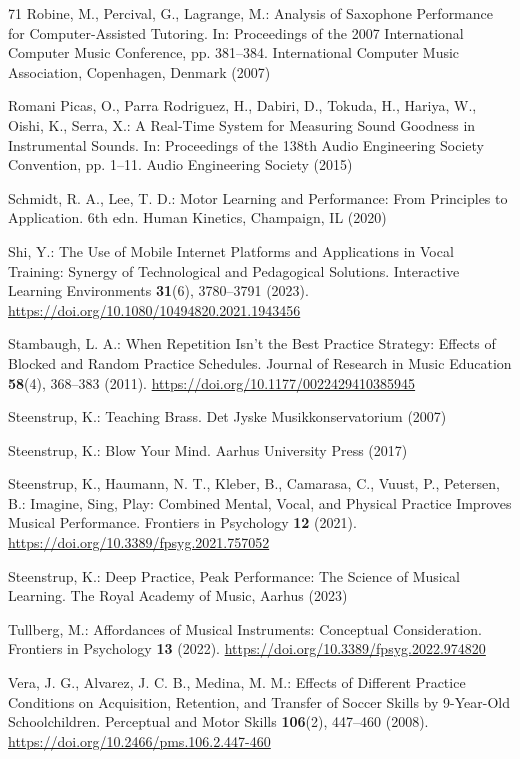 \documentclass[runningheads]{llncs}
\begin{document}
\begin{thebibliography}{71}
Robine, M., Percival, G., Lagrange, M.: Analysis of Saxophone Performance for Computer-Assisted Tutoring. In: Proceedings of the 2007 International Computer Music Conference, pp. 381--384. International Computer Music Association, Copenhagen, Denmark (2007)

Romani Picas, O., Parra Rodriguez, H., Dabiri, D., Tokuda, H., Hariya, W., Oishi, K., Serra, X.: A Real-Time System for Measuring Sound Goodness in Instrumental Sounds. In: Proceedings of the 138th Audio Engineering Society Convention, pp. 1--11. Audio Engineering Society (2015)

Schmidt, R. A., Lee, T. D.: Motor Learning and Performance: From Principles to Application. 6th edn. Human Kinetics, Champaign, IL (2020)

Shi, Y.: The Use of Mobile Internet Platforms and Applications in Vocal Training: Synergy of Technological and Pedagogical Solutions. Interactive Learning Environments \textbf{31}(6), 3780--3791 (2023). \url{https://doi.org/10.1080/10494820.2021.1943456}

Stambaugh, L. A.: When Repetition Isn’t the Best Practice Strategy: Effects of Blocked and Random Practice Schedules. Journal of Research in Music Education \textbf{58}(4), 368--383 (2011). \url{https://doi.org/10.1177/0022429410385945}

Steenstrup, K.: Teaching Brass. Det Jyske Musikkonservatorium (2007)

Steenstrup, K.: Blow Your Mind. Aarhus University Press (2017)

Steenstrup, K., Haumann, N. T., Kleber, B., Camarasa, C., Vuust, P., Petersen, B.: Imagine, Sing, Play: Combined Mental, Vocal, and Physical Practice Improves Musical Performance. Frontiers in Psychology \textbf{12} (2021). \url{https://doi.org/10.3389/fpsyg.2021.757052}

Steenstrup, K.: Deep Practice, Peak Performance: The Science of Musical Learning. The Royal Academy of Music, Aarhus (2023)

Tullberg, M.: Affordances of Musical Instruments: Conceptual Consideration. Frontiers in Psychology \textbf{13} (2022). \url{https://doi.org/10.3389/fpsyg.2022.974820}

Vera, J. G., Alvarez, J. C. B., Medina, M. M.: Effects of Different Practice Conditions on Acquisition, Retention, and Transfer of Soccer Skills by 9-Year-Old Schoolchildren. Perceptual and Motor Skills \textbf{106}(2), 447--460 (2008). \url{https://doi.org/10.2466/pms.106.2.447-460}


\end{thebibliography}
\end{document}

